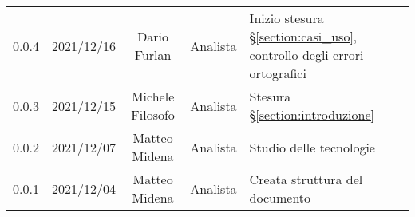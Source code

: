 \begin{center}
\begin{longtable}[c]{c | c | c | c | p{5cm}}
		0.0.4 & 2021/12/16 & Dario Furlan & Analista & Inizio stesura §\ref{section:casi_uso}, controllo degli errori ortografici\\
		0.0.3 & 2021/12/15 & Michele Filosofo & Analista & Stesura §\ref{section:introduzione}\\
		0.0.2 & 2021/12/07 & Matteo Midena & Analista & Studio delle tecnologie\\
		0.0.1 & 2021/12/04 & Matteo Midena & Analista & Creata struttura del documento\\
	\end{longtable}
\end{center}
